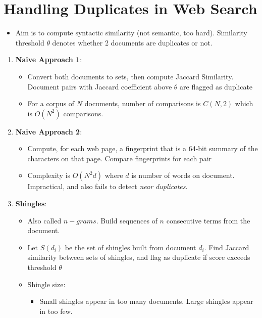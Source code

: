\documentclass{article}
\begin{document}
\section{Handling Duplicates in Web Search}
\begin{itemize}
    \item Aim is to compute syntactic similarity (not semantic, too hard). Similarity threshold $\theta$ denotes whether 2 documents are duplicates or not.
\end{itemize}
\begin{enumerate}
    \item \textbf{Naive Approach 1}:
    \begin{itemize}
        \item  Convert both documents to sets, then compute Jaccard Similarity. Document pairs with Jaccard coefficient above $\theta$ are flagged as duplicate
    
        \item For a corpus of $N$ documents, number of comparisons is $C(N, 2)$ which is $O(N^2)$ comparisons.
    \end{itemize}
    
    \item \textbf{Naive Approach 2}:
    \begin{itemize}
        \item Compute, for each web page, a fingerprint that is a 64-bit summary of the characters on that page. Compare fingerprints for each pair
    
        \item Complexity is $O(N^2d)$ where $d$ is number of words on document. Impractical, and also fails to detect \textit{near duplicates}.
    \end{itemize}
    
    \item \textbf{Shingles}:
    \begin{itemize}
        \item Also called $n-grams$. Build sequences of $n$ consecutive terms from the document. 
        
        \item Let $S(d_i)$ be the set of shingles built from document $d_i$. Find Jaccard similarity between sets of shingles, and flag as duplicate if score exceeds threshold $\theta$
        
        \item Shingle size:
        \begin{itemize}
            \item Small shingles appear in too many documents. Large shingles appear in too few. 
            

\end{itemize}
\end{itemize}
\end{enumerate}
\end{document}

